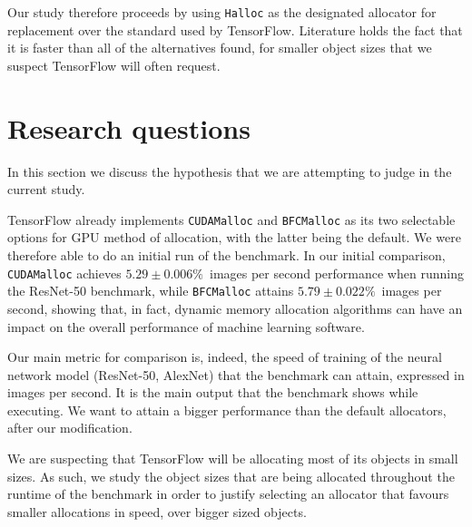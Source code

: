 \documentclass[12pt,twoside]{article}
\newcommand{\resnettimebfc}{$5.79\pm0.022\%$}     %
\newcommand{\resnettimecuda}{$5.29\pm0.006\%$}    %
\begin{document}
Our study therefore proceeds by using \texttt{Halloc} as the designated allocator for replacement over the standard used by TensorFlow. Literature holds the fact that it is faster than all of the alternatives found, for smaller object sizes that we suspect TensorFlow will often request.



\section{Research questions}
\label{sec:questions}

In this section we discuss the hypothesis that we are attempting to judge in the current study.

TensorFlow already implements \texttt{CUDAMalloc} and \texttt{BFCMalloc} as its two selectable options for GPU method of allocation, with the latter being the default. We were therefore able to do an initial run of the benchmark. In our initial comparison, \texttt{CUDAMalloc} achieves \resnettimecuda\ images per second performance when running the ResNet-50 benchmark, while \texttt{BFCMalloc} attains \resnettimebfc\ images per second, showing that, in fact, dynamic memory allocation algorithms can have an impact on the overall performance of machine learning software.

Our main metric for comparison is, indeed, the speed of training of the neural network model (ResNet-50, AlexNet) that the benchmark can attain, expressed in images per second. It is the main output that the benchmark shows while executing. We want to attain a bigger performance than the default allocators, after our modification. 

We are suspecting that TensorFlow will be allocating most of its objects in small sizes. As such, we study the object sizes that are being allocated throughout the runtime of the benchmark in order to justify selecting an allocator that favours smaller allocations in speed, over bigger sized objects. 
\end{document}
